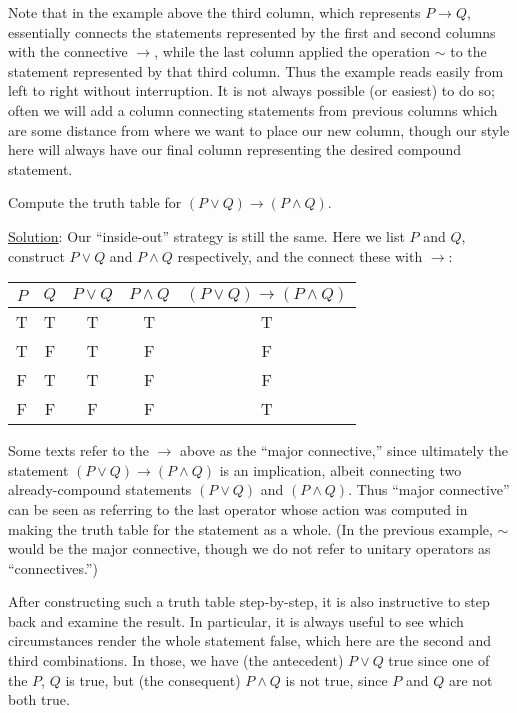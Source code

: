 Note that in the example above the third column,
which represents $P\longrightarrow Q$,
essentially connects the statements represented
by the first and second columns with the
connective $\longrightarrow$, while the last column
applied the operation $\sim$ to the statement represented by
that third column.  Thus the example reads easily from left to
right without interruption.  It is not always possible 
(or easiest) to do so; often we will add a column connecting
statements from previous columns which are some distance from
where we want to place our new column, though our style 
here will always have our final column representing the desired
compound statement.

\bex Compute the truth table for $(P\vee Q)\longrightarrow(P\wedge Q)$.
  
  \underline{Solution}:  Our ``inside-out'' strategy is 
still the same.  Here we list $P$ and $Q$, construct $P\vee Q$ and
$P\wedge Q$ respectively, and the connect these with $\longrightarrow$:
\begin{center}
\begin{tabular}{|c|c||c|c|c|}
\hline
$P$&$Q$&$P\vee Q$&$P\wedge Q$&$(P\vee Q)\longrightarrow(P\wedge Q)$\\
\hline
T&T&T&T&T\\
T&F&T&F&F\\
F&T&T&F&F\\
F&F&F&F&T\\
\hline
\end{tabular}
\end{center}

\eex

Some texts refer to the $\longrightarrow$ above as
the ``major connective,'' since ultimately the statement
$(P\vee Q)\longrightarrow(P\wedge Q)$ is an implication, albeit
connecting two already-compound statements $(P\vee Q)$ and
$(P\wedge Q)$.  Thus ``major connective'' can be seen
as referring to the last operator whose action was computed
in making the truth table for the statement as a whole.
(In the previous example, $\sim$ would be the major connective,
though we do not refer to unitary operators as 
``connectives.'')

After constructing such a truth table step-by-step, it is 
also instructive to step back and examine the result.
In particular, it is always useful to see which circumstances
render the whole statement false, which here are the second
and third combinations.  In those, we have (the 
antecedent)  $P\vee Q$ true
since one of the $P$, $Q$ is true, 
but (the consequent) $P\wedge Q$ is not true, since
$P$ and $Q$ are not both true.

